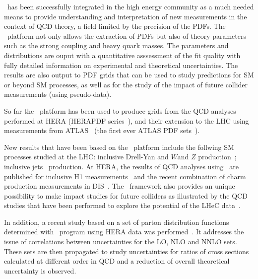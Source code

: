 \fitter\ has been successfully integrated in the high energy community as a much needed means to provide understanding and interpretation of new measurements in the context of QCD theory, a field limited by the precision of the PDFs.  
The \fitter\ platform not only allows the extraction of PDFs but also of theory parameters such as the strong coupling and heavy quark masses. The parameters and distributions are ouput with a
quantitative asssessment of the fit quality with fully detailed information on 
experimental and theoretical uncertainties.
The results are also output to PDF grids that can be used to study predictions for SM or beyond SM processes, as well as for the study of the impact of 
future collider measurements (using pseudo-data).


So far the \fitter\ platform has been used to produce grids 
from the QCD analyses performed at 
HERA (HERAPDF series~\cite{h1zeus:2009wt}), and their extension to the LHC 
using 
measurements from ATLAS~\cite{atlas:strange,atlas:jets} (the first ever ATLAS PDF sets~\cite{atlas:grids}).

New results that have been based on the \fitter\ platform include 
the follwing SM processes 
studied at the LHC:  inclusive Drell-Yan and $W$and $Z$ 
production~\cite{atlas:strange,atlas:hm,cms:strange};
inclusive jets~\cite{atlas:jets,cms:jets} production.
At HERA, the results of QCD analyses using \fitter\ are 
published for inclusive H1 measurements~\cite{h1:2012kk}
and the recent combination of charm production measurements 
in DIS~\cite{h1zeus:charm}.
The \fitter\ framework also provides an unique possibility to 
make impact studies for future colliders
as illustrated by the QCD studies that have been performed to 
explore the potential of the LHeC data~\cite{lhec:studies}.

In addition, a recent study based on a set of parton distribution functions 
determined with \fitter\ program using HERA data was performed~\cite{hfcorrpaper}.
It addresses the issue of correlations between uncertainties for the LO,
NLO and NNLO sets. These sets are then propagated to study uncertainties 
for ratios of cross sections calculated at different order in QCD and  
a reduction of overall theoretical uncertainty is observed.


